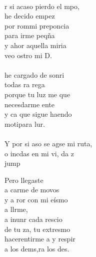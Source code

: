 \begin{cancion}
	\jump\\
	r si acaso pierdo el mpo, \\
	he decido empez\\
	por rommi preponcia \\
	para irme peqña\\
	y ahor aquella miria\\
	veo ostro mi D. \\
	\jump\\
	 he cargado de sonri \\
	todas ra rega\\
	porque tu luz me que \\
	necesdarme ente \\
	y ca que sigue haendo \\
	motipara lur. \\
	\jump\\
	Y por si aso se agse mi ruta,\\
	o incdas en mi vi, da z\\jump\\
	\begin{chorus}%
	Pero llegaste   \\
	a carme de movos\\
	y a ror con mi eísmo\\
	a llrme, \\
	a inunr cada rescio\\
	de tu za, tu extresmo \\
	hacerentirme a y respir \\
	a los dems,ra los des. \\
	\end{chorus}%
	\jump\\
\end{cancion}%
